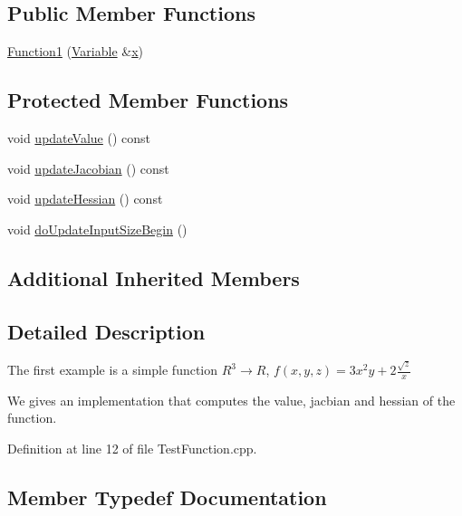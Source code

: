 \subsection*{Public Member Functions}
\begin{DoxyCompactItemize}
\item 
\hyperlink{classFunction1_a6b618d85fab472effe2624a8384c1674}{Function1} (\hyperlink{classocra_1_1Variable}{Variable} \&\hyperlink{classocra_1_1Function_a28825886d1f149c87b112ec2ec1dd486}{x})
\end{DoxyCompactItemize}
\subsection*{Protected Member Functions}
\begin{DoxyCompactItemize}
\item 
void \hyperlink{classFunction1_a1b5ba96cfffc5a3138e2405d4d59d77f}{update\+Value} () const 
\item 
void \hyperlink{classFunction1_aa72f7dd1cbb83ace16bcf9a2ce8e8da2}{update\+Jacobian} () const 
\item 
void \hyperlink{classFunction1_a477718941571740ab565304c9bd80cef}{update\+Hessian} () const 
\item 
void \hyperlink{classFunction1_aec0bc51f050a1bd32cece26e524e5c97}{do\+Update\+Input\+Size\+Begin} ()
\end{DoxyCompactItemize}
\subsection*{Additional Inherited Members}


\subsection{Detailed Description}
The first example is a simple function $ R^3 \rightarrow R $, $ f(x,y,z) = 3x^2y+2\frac{\sqrt{z}}{x}$

We gives an implementation that computes the value, jacbian and hessian of the function. 

Definition at line 12 of file Test\+Function.\+cpp.



\subsection{Member Typedef Documentation}
